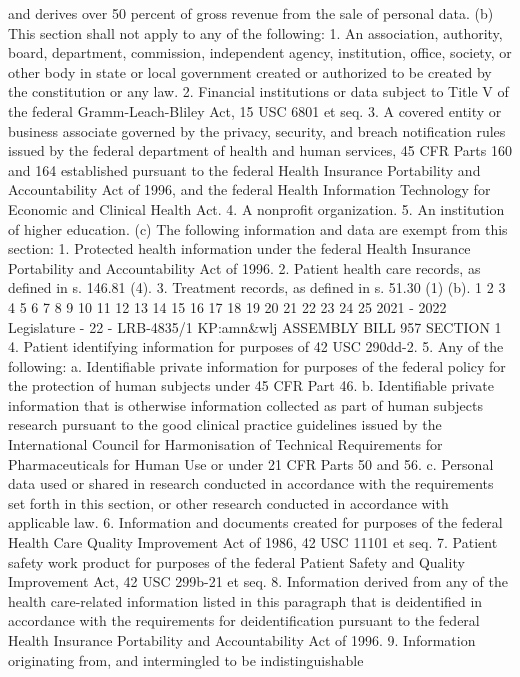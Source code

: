 and derives over 50 percent of gross revenue from the sale of personal data.
(b) This section shall not apply to any of the following:
1. An association, authority, board, department, commission, independent
agency, institution, office, society, or other body in state or local government created
or authorized to be created by the constitution or any law.
2. Financial institutions or data subject to Title V of the federal
Gramm-Leach-Bliley Act, 15 USC 6801 et seq.
3. A covered entity or business associate governed by the privacy, security, and
breach notification rules issued by the federal department of health and human
services, 45 CFR Parts 160 and 164 established pursuant to the federal Health
Insurance Portability and Accountability Act of 1996, and the federal Health
Information Technology for Economic and Clinical Health Act.
4. A nonprofit organization.
5. An institution of higher education.
(c) The following information and data are exempt from this section:
1. Protected health information under the federal Health Insurance Portability
and Accountability Act of 1996.
2. Patient health care records, as defined in s. 146.81 (4).
3. Treatment records, as defined in s. 51.30 (1) (b).
1
2
3
4
5
6
7
8
9
10
11
12
13
14
15
16
17
18
19
20
21
22
23
24
25
2021 - 2022 Legislature - 22 - LRB-4835/1
KP:amn&wlj
 ASSEMBLY BILL 957 SECTION 1
4. Patient identifying information for purposes of 42 USC 290dd-2.
5. Any of the following:
a. Identifiable private information for purposes of the federal policy for the
protection of human subjects under 45 CFR Part 46.
b. Identifiable private information that is otherwise information collected as
part of human subjects research pursuant to the good clinical practice guidelines
issued by the International Council for Harmonisation of Technical Requirements
for Pharmaceuticals for Human Use or under 21 CFR Parts 50 and 56.
c. Personal data used or shared in research conducted in accordance with the
requirements set forth in this section, or other research conducted in accordance with
applicable law.
6. Information and documents created for purposes of the federal Health Care
Quality Improvement Act of 1986, 42 USC 11101 et seq.
7. Patient safety work product for purposes of the federal Patient Safety and
Quality Improvement Act, 42 USC 299b-21 et seq.
8. Information derived from any of the health care-related information listed
in this paragraph that is deidentified in accordance with the requirements for
deidentification pursuant to the federal Health Insurance Portability and
Accountability Act of 1996.
9. Information originating from, and intermingled to be indistinguishable
